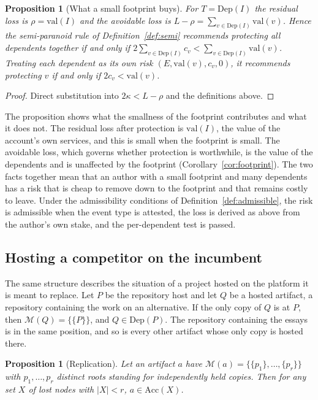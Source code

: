 \documentclass[11pt]{article}
\theoremstyle{plain}
\newtheorem{proposition}[theorem]{Proposition}
\theoremstyle{definition}
\theoremstyle{remark}
\begin{document}
\begin{proposition}[What a small footprint buys]\label{prop:footprint}
For $T=\mathrm{Dep}(I)$ the residual loss is $\rho=\mathrm{val}(I)$ and the avoidable loss is $L-\rho=\sum_{v\in\mathrm{Dep}(I)}\mathrm{val}(v)$. Hence the semi-paranoid rule of Definition~\ref{def:semi} recommends protecting all dependents together if and only if $2\sum_{v\in\mathrm{Dep}(I)}c_v<\sum_{v\in\mathrm{Dep}(I)}\mathrm{val}(v)$. Treating each dependent as its own risk $(E,\mathrm{val}(v),c_v,0)$, it recommends protecting $v$ if and only if $2c_v<\mathrm{val}(v)$.
\end{proposition}

\begin{proof}
Direct substitution into $2\kappa<L-\rho$ and the definitions above. \qedhere
\end{proof}

The proposition shows what the smallness of the footprint contributes and what it does not. The residual loss after protection is $\mathrm{val}(I)$, the value of the account's own services, and this is small when the footprint is small. The avoidable loss, which governs whether protection is worthwhile, is the value of the dependents and is unaffected by the footprint (Corollary~\ref{cor:footprint}). The two facts together mean that an author with a small footprint and many dependents has a risk that is cheap to remove down to the footprint and that remains costly to leave. Under the admissibility conditions of Definition~\ref{def:admissible}, the risk is admissible when the event type is attested, the loss is derived as above from the author's own stake, and the per-dependent test is passed.

\subsection{Hosting a competitor on the incumbent}

The same structure describes the situation of a project hosted on the platform it is meant to replace. Let $P$ be the repository host and let $Q$ be a hosted artifact, a repository containing the work on an alternative. If the only copy of $Q$ is at $P$, then $\mathcal M(Q)=\{\{P\}\}$, and $Q\in\mathrm{Dep}(P)$. The repository containing the essays is in the same position, and so is every other artifact whose only copy is hosted there.

\begin{proposition}[Replication]\label{prop:replication}
Let an artifact $a$ have $\mathcal M(a)=\{\{p_1\},\ldots,\{p_r\}\}$ with $p_1,\ldots,p_r$ distinct roots standing for independently held copies. Then for any set $X$ of lost nodes with $|X|<r$, $a\in\mathrm{Acc}(X)$.
\end{proposition}
\end{document}

